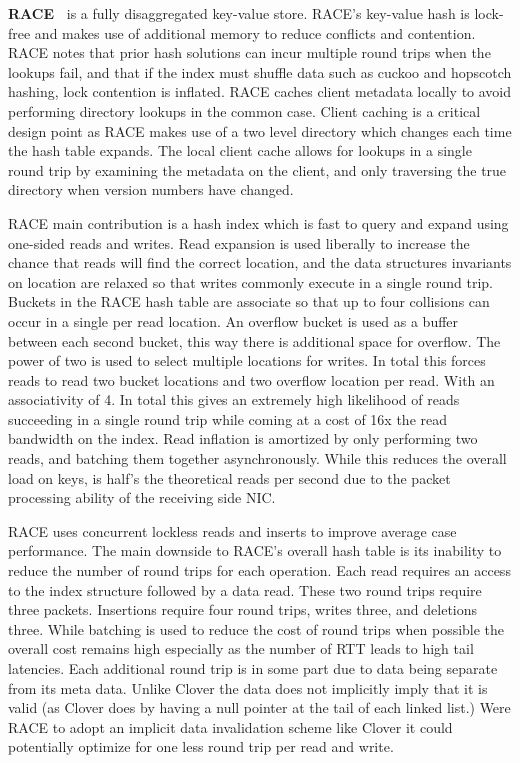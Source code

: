 \textbf{RACE~\cite{one-sided-hash}}
is a fully disaggregated key-value store. RACE's key-value hash is lock-free and
makes use of additional memory to reduce conflicts and contention. RACE notes
that prior hash solutions can incur multiple round trips when the lookups fail,
and that if the index must shuffle data such as cuckoo and hopscotch hashing,
lock contention is inflated. RACE caches client metadata locally to avoid
performing directory lookups in the common case. Client caching is a critical
design point as RACE makes use of a two level directory which changes each time
the hash table expands. The local client cache allows for lookups in a single
round trip by examining the metadata on the client, and only traversing the true
directory when version numbers have changed.

RACE main contribution is a hash index which is fast to query and expand using
one-sided reads and writes. Read expansion is used liberally to increase the
chance that reads will find the correct location, and the data structures
invariants on location are relaxed so that writes commonly execute in a single
round trip.  Buckets in the RACE hash table are associate so that up to four
collisions can occur in a single per read location. An overflow bucket is used
as a buffer between each second bucket, this way there is additional space for
overflow. The power of two is used to select multiple locations for writes. In
total this forces reads to read two bucket locations and two overflow location
per read.  With an associativity of 4. In total this gives an extremely high
likelihood of reads succeeding in a single round trip while coming at a cost of
16x the read bandwidth on the index. Read inflation is amortized by only
performing two reads, and batching them together asynchronously. While this
reduces the overall load on keys, is half's the theoretical reads per second due
to the packet processing ability of the receiving side NIC. 

RACE uses concurrent lockless reads and inserts to improve average case
performance. The main downside to RACE's overall hash table is its inability to
reduce the number of round trips for each operation. Each read requires an
access to the index structure followed by a data read. These two round trips
require three packets.  Insertions require four round trips, writes three, and
deletions three. While batching is used to reduce the cost of round trips when
possible the overall cost remains high especially as the number of RTT leads to
high tail latencies. Each additional round trip is in some part due to data
being separate from its meta data. Unlike Clover the data does not implicitly
imply that it is valid (as Clover does by having a null pointer at the tail of
each linked list.) Were RACE to adopt an implicit data invalidation scheme like
Clover it could potentially optimize for one less round trip per read and write.

